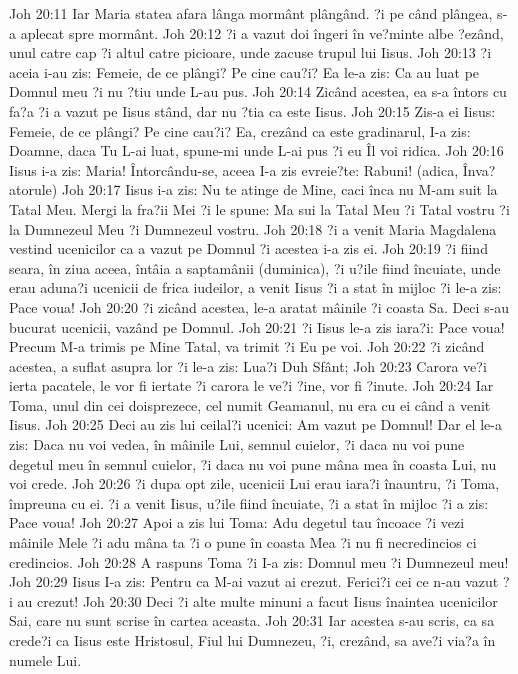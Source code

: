Joh 20:11  Iar Maria statea afara lânga mormânt plângând. ?i pe când plângea, s-a aplecat spre mormânt.
Joh 20:12  ?i a vazut doi îngeri în ve?minte albe ?ezând, unul catre cap ?i altul catre picioare, unde zacuse trupul lui Iisus.
Joh 20:13  ?i aceia i-au zis: Femeie, de ce plângi? Pe cine cau?i? Ea le-a zis: Ca au luat pe Domnul meu ?i nu ?tiu unde L-au pus.
Joh 20:14  Zicând acestea, ea s-a întors cu fa?a ?i a vazut pe Iisus stând, dar nu ?tia ca este Iisus.
Joh 20:15  Zis-a ei Iisus: Femeie, de ce plângi? Pe cine cau?i? Ea, crezând ca este gradinarul, I-a zis: Doamne, daca Tu L-ai luat, spune-mi unde L-ai pus ?i eu Îl voi ridica.
Joh 20:16  Iisus i-a zis: Maria! Întorcându-se, aceea I-a zis evreie?te: Rabuni! (adica, Înva?atorule)
Joh 20:17  Iisus i-a zis: Nu te atinge de Mine, caci înca nu M-am suit la Tatal Meu. Mergi la fra?ii Mei ?i le spune: Ma sui la Tatal Meu ?i Tatal vostru ?i la Dumnezeul Meu ?i Dumnezeul vostru.
Joh 20:18  ?i a venit Maria Magdalena vestind ucenicilor ca a vazut pe Domnul ?i acestea i-a zis ei.
Joh 20:19  ?i fiind seara, în ziua aceea, întâia a saptamânii (duminica), ?i u?ile fiind încuiate, unde erau aduna?i ucenicii de frica iudeilor, a venit Iisus ?i a stat în mijloc ?i le-a zis: Pace voua!
Joh 20:20  ?i zicând acestea, le-a aratat mâinile ?i coasta Sa. Deci s-au bucurat ucenicii, vazând pe Domnul.
Joh 20:21  ?i Iisus le-a zis iara?i: Pace voua! Precum M-a trimis pe Mine Tatal, va trimit ?i Eu pe voi.
Joh 20:22  ?i zicând acestea, a suflat asupra lor ?i le-a zis: Lua?i Duh Sfânt;
Joh 20:23  Carora ve?i ierta pacatele, le vor fi iertate ?i carora le ve?i ?ine, vor fi ?inute.
Joh 20:24  Iar Toma, unul din cei doisprezece, cel numit Geamanul, nu era cu ei când a venit Iisus.
Joh 20:25  Deci au zis lui ceilal?i ucenici: Am vazut pe Domnul! Dar el le-a zis: Daca nu voi vedea, în mâinile Lui, semnul cuielor, ?i daca nu voi pune degetul meu în semnul cuielor, ?i daca nu voi pune mâna mea în coasta Lui, nu voi crede.
Joh 20:26  ?i dupa opt zile, ucenicii Lui erau iara?i înauntru, ?i Toma, împreuna cu ei. ?i a venit Iisus, u?ile fiind încuiate, ?i a stat în mijloc ?i a zis: Pace voua!
Joh 20:27  Apoi a zis lui Toma: Adu degetul tau încoace ?i vezi mâinile Mele ?i adu mâna ta ?i o pune în coasta Mea ?i nu fi necredincios ci credincios.
Joh 20:28  A raspuns Toma ?i I-a zis: Domnul meu ?i Dumnezeul meu!
Joh 20:29  Iisus I-a zis: Pentru ca M-ai vazut ai crezut. Ferici?i cei ce n-au vazut ?i au crezut!
Joh 20:30  Deci ?i alte multe minuni a facut Iisus înaintea ucenicilor Sai, care nu sunt scrise în cartea aceasta.
Joh 20:31  Iar acestea s-au scris, ca sa crede?i ca Iisus este Hristosul, Fiul lui Dumnezeu, ?i, crezând, sa ave?i via?a în numele Lui.
